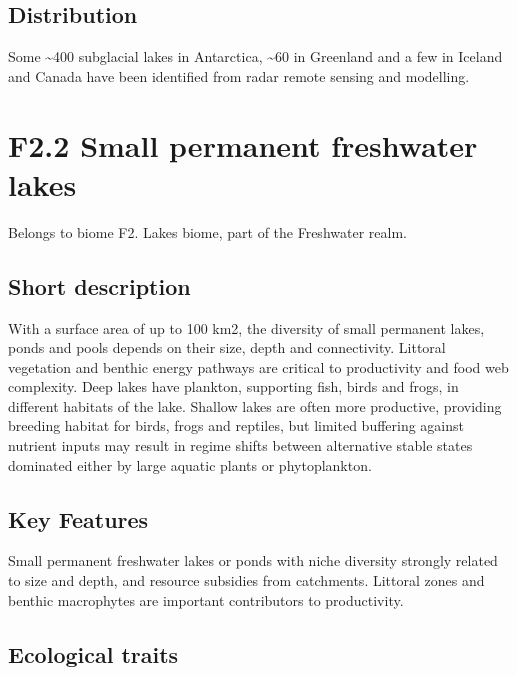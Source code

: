 \documentclass[
  letterpaper,
  DIV=11,
  numbers=noendperiod]{scrartcl}
\begin{document}
\subsection{Distribution}\label{distribution-8}

Some \textasciitilde400 subglacial lakes in Antarctica,
\textasciitilde60 in Greenland and a few in Iceland and Canada have been
identified from radar remote sensing and modelling.

\section{F2.2 Small permanent freshwater
lakes}\label{f2.2-small-permanent-freshwater-lakes}

Belongs to biome F2. Lakes biome, part of the Freshwater realm.

\subsection{Short description}\label{short-description-9}

With a surface area of up to 100 km2, the diversity of small permanent
lakes, ponds and pools depends on their size, depth and connectivity.
Littoral vegetation and benthic energy pathways are critical to
productivity and food web complexity. Deep lakes have plankton,
supporting fish, birds and frogs, in different habitats of the lake.
Shallow lakes are often more productive, providing breeding habitat for
birds, frogs and reptiles, but limited buffering against nutrient inputs
may result in regime shifts between alternative stable states dominated
either by large aquatic plants or phytoplankton.

\subsection{Key Features}\label{key-features-9}

Small permanent freshwater lakes or ponds with niche diversity strongly
related to size and depth, and resource subsidies from catchments.
Littoral zones and benthic macrophytes are important contributors to
productivity.

\subsection{Ecological traits}\label{ecological-traits-9}
\end{document}
